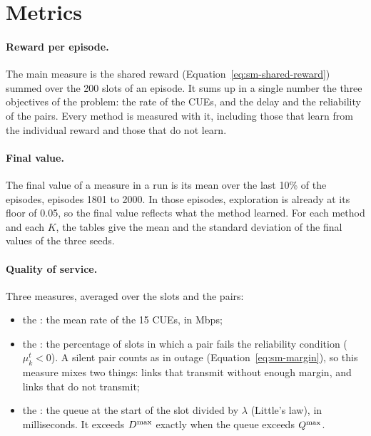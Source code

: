 \section{Metrics}
\label{sec:exp-metrics}

\paragraph{Reward per episode.} The main measure is the shared reward (Equation~\ref{eq:sm-shared-reward})
summed over the 200 slots of an episode. It sums up in a single number the three objectives of the problem:
the rate of the \acp{CUE}, and the delay and the reliability of the pairs. Every method is measured with it,
including those that learn from the individual reward and those that do not learn.

\paragraph{Final value.} The final value of a measure in a run is its mean over the last 10\% of the episodes,
episodes 1801 to 2000. In those episodes, exploration is already at its floor of 0.05, so the final value
reflects what the method learned. For each method and each $K$, the tables give the mean and the standard
deviation of the final values of the three seeds.

\paragraph{Quality of service.} Three measures, averaged over the slots and the pairs:
\begin{itemize}[nosep]
  \item the : the mean rate of the 15 \acp{CUE}, in Mbps;
  \item the : the percentage of slots in which a pair fails the reliability condition
    ($\mu_k^t < 0$). A silent pair counts as in outage (Equation~\ref{eq:sm-margin}), so this measure mixes
    two things: links that transmit without enough margin, and links that do not transmit;
  \item the : the queue at the start of the slot divided by $\lambda$ (Little's law), in
    milliseconds. It exceeds $D^{\mathrm{max}}$ exactly when the queue exceeds $Q^{\mathrm{max}}$.
\end{itemize}

